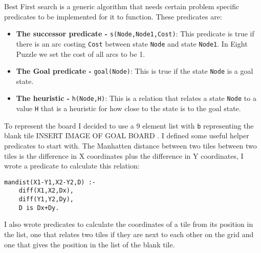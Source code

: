 \documentclass[a4paper,12pt]{report}
\begin{document}
Best First search is a generic algorithm that needs certain problem specific predicates to be implemented for it to function. These predicates are:
\begin{itemize}
\item \textbf{The successor predicate - }\texttt{s(Node,Node1,Cost)}: This predicate is true if there is an arc costing \texttt{Cost} between state \texttt{Node} and state \texttt{Node1}. In Eight Puzzle we set the cost of all arcs to be 1.
\item \textbf{The Goal predicate - }\texttt{goal(Node)}: This is true if the state \texttt{Node} is a goal state.
\item \textbf{The heuristic - }\texttt{h(Node,H)}: This is a relation that relates a state \texttt{Node} to a value \texttt{H} that is a heuristic for how close to the state is to the goal state.
\end{itemize}
To represent the board I decided to use a 9 element list with \texttt{b} representing the blank tile INSERT IMAGE OF GOAL BOARD .
I defined some useful helper predicates to start with. The Manhatten distance between two tiles between two tiles is the difference in X coordinates plus the difference in Y coordinates, I wrote a predicate to calculate this relation:
\begin{verbatim}
mandist(X1-Y1,X2-Y2,D) :-
    diff(X1,X2,Dx),
    diff(Y1,Y2,Dy),
    D is Dx+Dy.
\end{verbatim}
I also wrote predicates to calculate the coordinates of a tile from its position in the list, one that relates two tiles if they are next to each other on the grid and one that gives the position in the list of the blank tile.
\end{document}
